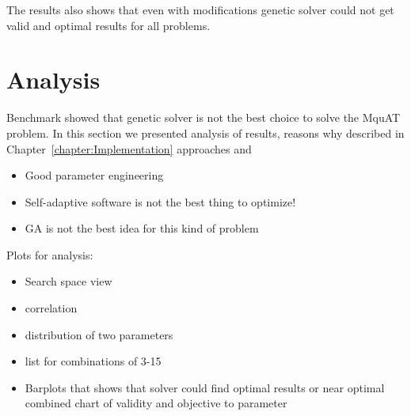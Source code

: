 The results also shows that even with modifications genetic solver could not get valid and optimal results for all problems.


\section{Analysis}
Benchmark showed that genetic solver is not the best choice to solve the MquAT problem.
In this section we presented analysis of results, reasons why described in Chapter~\ref{chapter:Implementation} approaches and 


\begin{itemize}
	\item Good parameter engineering 
	\item Self-adaptive software is not the best thing to optimize!
	\item GA is not the best idea for this kind of problem
\end{itemize}

Plots for analysis:
\begin{itemize}
	\item Search space view
	\item correlation
	\item distribution of two parameters
	\item list for combinations of 3-15
	\item Barplots that shows that solver could find optimal results or near optimal 
	combined chart of validity and objective to parameter
	
\end{itemize}